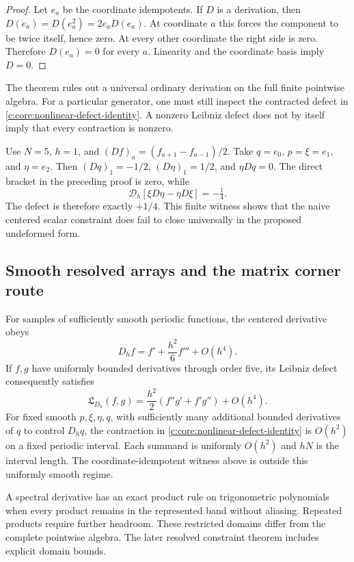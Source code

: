 \begin{proof}
Let $e_a$ be the coordinate idempotents. If $D$ is a derivation, then
$D(e_a)=D(e_a^2)=2e_aD(e_a)$. At coordinate $a$ this forces the
component to be twice itself, hence zero. At every other coordinate
the right side is zero. Therefore $D(e_a)=0$ for every $a$. Linearity
and the coordinate basis imply $D=0$.
\end{proof}

The theorem rules out a universal ordinary derivation on the full
finite pointwise algebra. For a particular generator, one must still
inspect the contracted defect in
\eqref{c:core:nonlinear-defect-identity}. A nonzero Leibniz defect
does not by itself imply that every contraction is nonzero.

\begin{example}
\label{c:core:bracket-negative-control}
Use $N=5$, $h=1$, and $(Df)_a=(f_{a+1}-f_{a-1})/2$.
Take $q=e_0$, $p=\xi=e_1$, and $\eta=e_2$. Then
$(Dq)_1=-1/2$, $(D\eta)_1=1/2$, and $\eta Dq=0$.
The direct bracket in the preceding proof is zero, while
\[
 \mathcal D_h[\xi D\eta-\eta D\xi]=-\tfrac14.
\]
The defect is therefore exactly $+1/4$. This finite witness shows
that the naive centered scalar constraint does fail to close
universally in the proposed undeformed form.
\end{example}

\subsection{Smooth resolved arrays and the matrix corner route}

For samples of sufficiently smooth periodic functions, the centered
derivative obeys
\[
 D_hf=f'+\frac{h^2}{6}f'''+O(h^4).
\]
If $f,g$ have uniformly bounded derivatives through order five, its
Leibniz defect consequently satisfies
\begin{equation}
 \mathfrak L_{D_h}(f,g)
 =\frac{h^2}{2}(f''g'+f'g'')+O(h^4).
 \label{c:core:smooth-defect}
\end{equation}
For fixed smooth $p,\xi,\eta,q$, with sufficiently many additional
bounded derivatives of $q$ to control $D_hq$, the contraction in
\eqref{c:core:nonlinear-defect-identity} is $O(h^2)$ on a fixed periodic
interval. Each summand is uniformly $O(h^2)$ and $hN$ is the interval
length. The coordinate-idempotent witness above is outside this
uniformly smooth regime.

A spectral derivative has an exact product rule on trigonometric
polynomials when every product remains in the represented band without
aliasing. Repeated products require further headroom. These restricted
domains differ from the complete pointwise algebra. The later resolved
constraint theorem includes explicit domain bounds.

